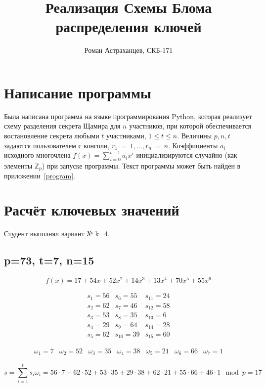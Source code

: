 \documentclass[a4paper,12pt]{article}
\title{Реализация Схемы Блома распределения ключей }
\author{Роман Астраханцев, СКБ-171}
\begin{document}
	\maketitle
	
	\section{Написание программы}
	Была написана программа на языке программирования Python, которая реализует схему разделения секрета Щамира для $n$ участников, при которой обеспечивается востановление секрета любыми $t$ участниками, $1\le t \le n$. Величины $p, n, t$ задаются пользователем с консоли, $r_1~=~1, \dots, r_n~=~n$. Коэффициенты $a_i$ исходного многочлена $f(x) = \sum_{i=0}^{t-1} a_{i} x^i$ инициализируются случайно (как элементы $\mathbb{Z}_p$) при запуске программы. Текст программы может быть найден в приложении~\ref{program}.
	
	\section{Расчёт ключевых значений}
	
	Студент выполнял вариант № k=4.

	\subsection{p=73, t=7, n=15}
	
	\[ f(x) = 17 + 54 x + 52 x^2 + 14 x^3 + 13 x^4 + 70 x^5 + 55 x^6  \]
	
	\[
	\begin{array}{ccc}	
		
		s_1 = 56	& 		s_6 = 55	&		s_{11} = 24 \\
		s_2 = 62	&		s_7 = 46	&		s_{12} = 58 \\
		s_3 = 53	&		s_8 = 35	&		s_{13} = 6  \\
		s_4 = 29	&		s_9 = 64	&		s_{14} = 28 \\
		s_5 = 62	&		s_{10} = 39 &		s_{15} = 60 

	\end{array}		
	\]
	
	
	\[
	\begin{array}{ccccccc}	
		\omega_1 = 7 & \omega_2 = 52 & \omega_3 = 35 & \omega_4 = 38 & \omega_5 = 21 & \omega_6 = 66 & \omega_7 = 1
	\end{array}		
	\]
	
	\[
		s = \sum_{i=1}^{t} s_i \omega_i = 56\cdot 7 + 62 \cdot 52 + 53 \cdot 35 + 29 \cdot 38 + 62 \cdot 21 + 55 \cdot 66 + 46 \cdot 1 \mod p = 17
	\]
		
\end{document}
